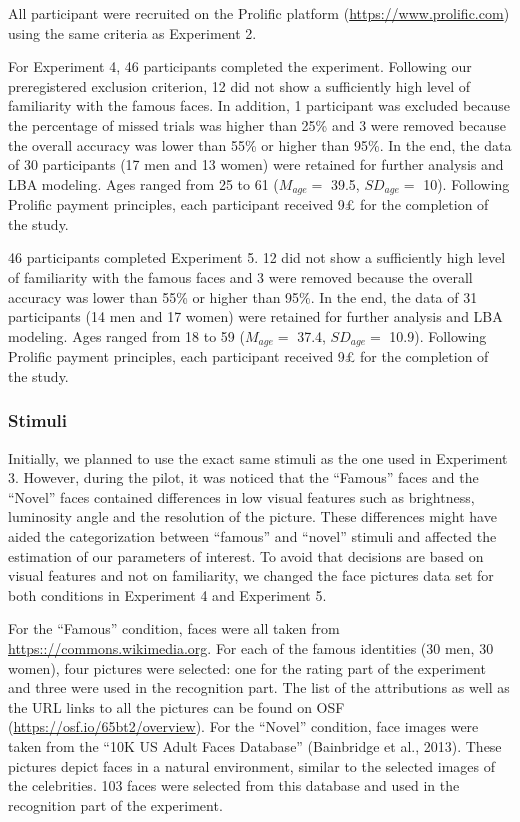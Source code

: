 \documentclass[
  letterpaper,
  DIV=11,
  numbers=noendperiod]{scrartcl}
\begin{document}
All participant were recruited on the Prolific platform
(\url{https://www.prolific.com}) using the same criteria as Experiment
2.

For Experiment 4, 46 participants completed the experiment. Following
our preregistered exclusion criterion, 12 did not show a sufficiently
high level of familiarity with the famous faces. In addition, 1
participant was excluded because the percentage of missed trials was
higher than 25\% and 3 were removed because the overall accuracy was
lower than 55\% or higher than 95\%. In the end, the data of 30
participants (17 men and 13 women) were retained for further analysis
and LBA modeling. Ages ranged from 25 to 61 (\(M_{age} =\) 39.5,
\(SD_{age} =\) 10). Following Prolific payment principles, each
participant received 9£ for the completion of the study.

46 participants completed Experiment 5. 12 did not show a sufficiently
high level of familiarity with the famous faces and 3 were removed
because the overall accuracy was lower than 55\% or higher than 95\%. In
the end, the data of 31 participants (14 men and 17 women) were retained
for further analysis and LBA modeling. Ages ranged from 18 to 59
(\(M_{age} =\) 37.4, \(SD_{age} =\) 10.9). Following Prolific payment
principles, each participant received 9£ for the completion of the
study.

\subsubsection{Stimuli}\label{stimuli-3}

Initially, we planned to use the exact same stimuli as the one used in
Experiment 3. However, during the pilot, it was noticed that the
``Famous'' faces and the ``Novel'' faces contained differences in low
visual features such as brightness, luminosity angle and the resolution
of the picture. These differences might have aided the categorization
between ``famous'' and ``novel'' stimuli and affected the estimation of
our parameters of interest. To avoid that decisions are based on visual
features and not on familiarity, we changed the face pictures data set
for both conditions in Experiment 4 and Experiment 5.

For the ``Famous'' condition, faces were all taken from
\url{https:://commons.wikimedia.org}. For each of the famous identities
(30 men, 30 women), four pictures were selected: one for the rating part
of the experiment and three were used in the recognition part. The list
of the attributions as well as the URL links to all the pictures can be
found on OSF (\url{https://osf.io/65bt2/overview}). For the ``Novel''
condition, face images were taken from the ``10K US Adult Faces
Database'' (Bainbridge et al., 2013). These pictures depict faces in a
natural environment, similar to the selected images of the celebrities.
103 faces were selected from this database and used in the recognition
part of the experiment.
\end{document}
